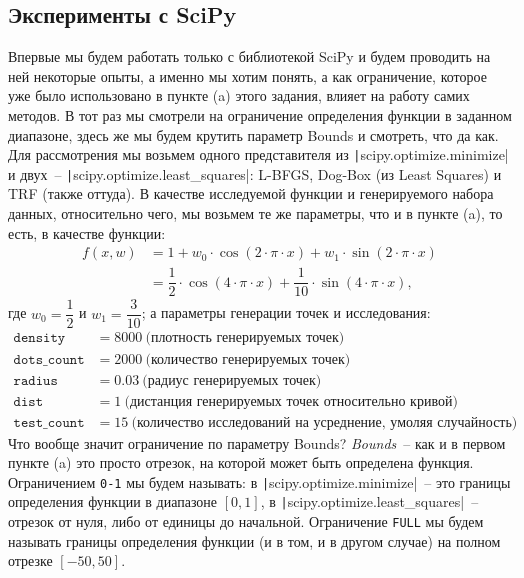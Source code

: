 \documentclass[12pt, a4paper, oneside, final]{article}
\begin{document}
	\subsection*{Эксперименты с SciPy}
	Впервые мы будем работать только с библиотекой SciPy и будем проводить на ней некоторые опыты, а именно мы хотим понять, а как ограничение, которое уже было использовано в пункте (a) этого задания, влияет на работу самих методов.
	В тот раз мы смотрели на ограничение определения функции в заданном диапазоне, здесь же мы будем крутить параметр Bounds и смотреть, что да как.
	Для рассмотрения мы возьмем одного представителя из \texttt|scipy.optimize.minimize| и двух~-- \texttt|scipy.optimize.least_squares|: L-BFGS, Dog-Box (из Least Squares) и TRF (также оттуда).
	В качестве исследуемой функции и генерируемого набора данных, относительно чего, мы возьмем те же параметры, что и в пункте (a), то есть, в качестве функции:
	\begin{align*}
		f(x, w) &= 1 + w_0 \cdot \cos{(2 \cdot \pi \cdot x)} + w_1 \cdot \sin{(2 \cdot \pi \cdot x)} \\
		&= \dfrac{1}{2} \cdot \cos{(4 \cdot \pi \cdot x)} + \dfrac{1}{10} \cdot \sin{(4 \cdot \pi \cdot x)},
	\end{align*} где $w_0 = \dfrac{1}{2}$ и $w_1 = \dfrac{3}{10}$; а параметры генерации точек и исследования:
	\begin{align*}
		\mathtt{density} &= 8000~\text{(плотность генерируемых точек)} \\
		\mathtt{dots\_count} &= 2000~\text{(количество генерируемых точек)} \\
		\mathtt{radius} &= 0.03~\text{(радиус генерируемых точек)} \\
		\mathtt{dist} &= 1~\text{(дистанция генерируемых точек относительно кривой)} \\
		\mathtt{test\_count} &= 15~\text{(количество исследований на усреднение, умоляя случайность)}
	\end{align*}
	Что вообще значит ограничение по параметру Bounds?
	\textit{Bounds}~-- как и в первом пункте (a) это просто отрезок, на которой может быть определена функция. Ограничением \texttt{0-1} мы будем называть: в \texttt|scipy.optimize.minimize|~-- это границы определения функции в диапазоне $[0, 1]$, в \texttt|scipy.optimize.least\_squares|~-- отрезок от нуля, либо от единицы до начальной. Ограничение \texttt{FULL} мы будем называть границы определения функции (и в том, и в другом случае) на полном отрезке $[-50, 50]$.
\end{document}
